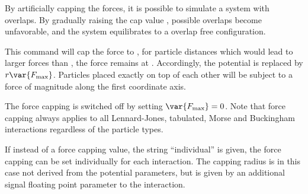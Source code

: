 By artificially capping the forces, it is possible to simulate a
system with overlaps. By gradually raising the cap value
, possible overlaps become unfavorable, and the
system equilibrates to a overlap free configuration.

This command will cap the force to , \ie for
particle distances which would lead to larger forces than
, the force remains at .
Accordingly, the potential is replaced by $r \var{F_\mathrm{max}}$.
Particles placed exactly on top of each other will be subject to a
force of magnitude  along the first coordinate axis.

The force capping is switched off by setting $\var{F_\mathrm{max}}=0$.
Note that force capping always applies to all Lennard-Jones, tabulated,
Morse and Buckingham interactions regardless of the particle types.

If instead of a force capping value, the string ``individual'' is
given, the force capping can be set individually for each
interaction. The capping radius is in this case not derived from the
potential parameters, but is given by an additional signal floating
point parameter to the interaction.

